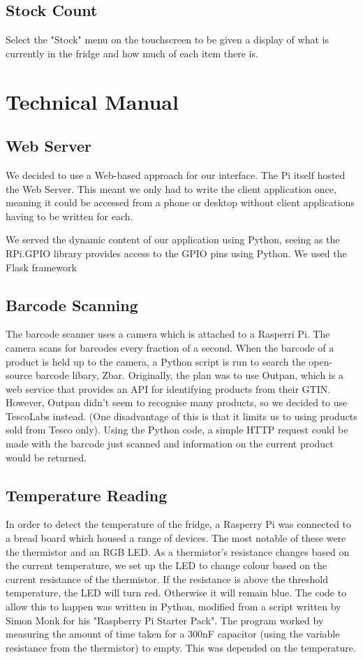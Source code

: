 \documentclass[10pt]{article}
\begin{document}
\subsection{Stock Count}
Select the "Stock" menu on the touchscreen to be given a display of what is currently in the fridge and how much of each item there is.




\section{Technical Manual}
\subsection{Web Server}
We decided to use a Web-based approach for our interface. The Pi itself hosted the Web Server. This meant we only had to write the client application once, meaning it could be accessed from a phone or desktop without client applications having to be written for each.

We served the dynamic content of our application using Python, seeing as the RPi.GPIO library provides access to the GPIO pins using Python. We used the Flask framework
\subsection{Barcode Scanning}
The barcode scanner uses a camera which is attached to a Rasperri Pi. The camera scans for barcodes every fraction of a second. When the barcode of a product is held up to the camera, a Python script is run to search the open-source barcode libary, Zbar. Originally, the plan was to use Outpan, which is a web service that provides an API for identifying products from their GTIN. However, Outpan didn't seem to recognise many products, so we decided to use TescoLabs instead. (One disadvantage of this is that it limits us to using products sold from Tesco only). Using the Python code, a simple HTTP request could be made with the barcode just scanned and information on the current product would be returned.
\subsection{Temperature Reading}
In order to detect the temperature of the fridge, a Rasperry Pi was connected to a bread board which housed a range of devices. The most notable of these were the thermistor and an RGB LED. As a thermistor's resistance changes based on the current temperature, we set up the LED to change colour based on the current resistance of the thermistor. If the resistance is above the threshold temperature, the LED will turn red. Otherwise it will remain blue. The code to allow this to happen was written in Python, modified from a script written by Simon Monk for his "Raspberry Pi Starter Pack". The program worked by measuring the amount of time taken for a 300nF capacitor (using the variable resistance from the thermistor) to empty. This was depended on the temperature.
\end{document}
